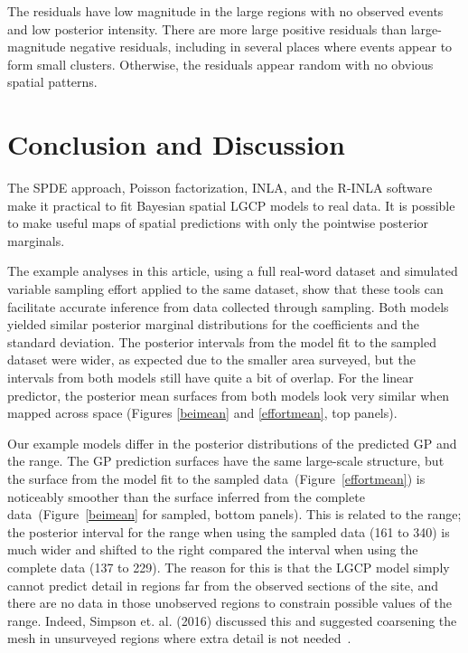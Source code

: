 \documentclass[]{interact}
\begin{document}
The residuals have low magnitude in the large regions with no observed events
and low posterior intensity. There are more large positive residuals than
large-magnitude negative residuals, including in several places where events
appear to form small clusters. Otherwise, the residuals appear random with no
obvious spatial patterns.


\section{Conclusion and Discussion}
\label{conclusion}

The SPDE approach, Poisson factorization, INLA, and the R-INLA software make
it practical to fit Bayesian spatial LGCP models to real data. It is possible
to make useful maps of spatial predictions with only the pointwise posterior
marginals.

The example analyses in this article, using a full real-word dataset and
simulated variable sampling effort applied to the same dataset, show that these
tools can facilitate accurate inference from data collected through sampling.
Both models yielded similar posterior marginal distributions for the
coefficients and the standard deviation. The posterior intervals from the
model fit to the sampled dataset were wider, as expected due to the smaller
area surveyed, but the intervals from both models still have quite a bit of
overlap. For the linear predictor, the posterior mean surfaces from both models
look very similar when mapped across space (Figures \ref{beimean} and
\ref{effortmean}, top panels).

Our example models differ in the posterior distributions of the predicted GP
and the range. The GP prediction surfaces have the same large-scale structure,
but the surface from the model fit to the sampled
data~(Figure~\ref{effortmean}) is noticeably smoother than the surface inferred
from the complete data~(Figure~\ref{beimean} for sampled, bottom panels).
This is related to the range; the posterior interval for the range when using
the sampled data (161 to 340) is much wider and shifted to the right compared
the interval when using the complete data (137 to 229). The reason for this is
that the LGCP model simply cannot predict detail in regions far from the
observed sections of the site, and there are no data in those unobserved
regions to constrain possible values of the range. Indeed, Simpson et. al.
(2016) discussed this and suggested coarsening the mesh in unsurveyed regions
where extra detail is not needed~\cite{simpsonetal}.
\end{document}
